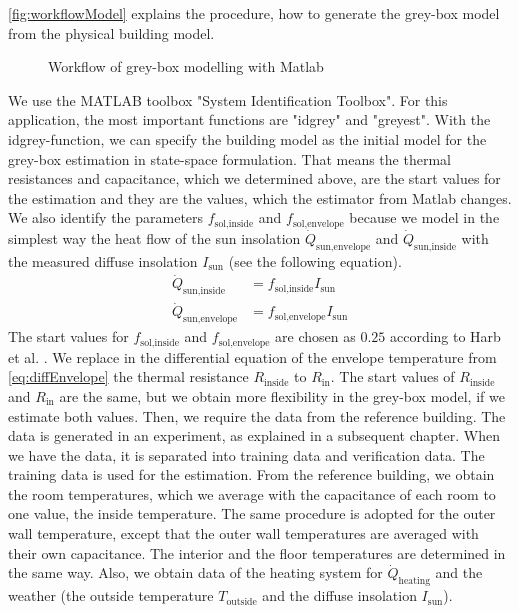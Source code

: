     \autoref{fig:workflowModel} explains the procedure, how to generate the grey-box model from the physical building model.\newline 
    \begin{figure}[h]
            \centering
            \def\svgwidth{400pt}
            
            \caption{Workflow of grey-box modelling with Matlab}
            \label{fig:workflowModel}
    \end{figure}
    We use the MATLAB toolbox "System Identification Toolbox". For this application, the most important functions are "idgrey" and "greyest".
    With the idgrey-function, we can specify the building model as the initial model for the grey-box estimation in state-space formulation. That means the thermal resistances and capacitance, which we determined above, are the start values for the estimation and they are the values, which the estimator from Matlab changes.
    We also identify the parameters $f_\text{sol,inside}$ and $f_\text{sol,envelope}$ because we model in the simplest way the heat flow of the sun insolation $\dot{Q}_\text{sun,envelope}$ and $\dot{Q}_\text{sun,inside}$ with the measured diffuse insolation $I_\text{sun}$ (see the following equation). 
    \begin{align}
       \label{eq:sun}
        \dot{Q}_\text{sun,inside} &= f_\text{sol,inside} I_\text{sun} \\
        \dot{Q}_\text{sun,envelope} &= f_\text{sol,envelope} I_\text{sun} \nonumber 
    \end{align}
    The start values for $f_\text{sol,inside}$ and $f_\text{sol,envelope}$ are chosen as $0.25$ according to Harb et al. \cite{Harb.2016}. We replace in the differential equation of the envelope temperature from \autoref{eq:diffEnvelope} the thermal resistance $R_\text{inside}$ to $R_\text{in}$. The start values of $R_\text{inside}$ and $R_\text{in}$ are the same, but we obtain more flexibility in the grey-box model, if we estimate both values.\newline
    Then, we require the data from the reference building. The data is generated in an experiment, as explained in a subsequent chapter. When we have the data, it is separated into training data and verification data. The training data is used for the estimation. From the reference building, we obtain the room temperatures, which we average with the capacitance of each room to one value, the inside temperature. The same procedure is adopted for the outer wall temperature, except that the outer wall temperatures are averaged with their own capacitance. The interior and the floor temperatures are determined in the same way. Also, we obtain data of the heating system for $\dot{Q}_\text{heating}$ and the weather (the outside temperature $T_\text{outside}$ and the diffuse insolation $I_\text{sun}$). \newline
